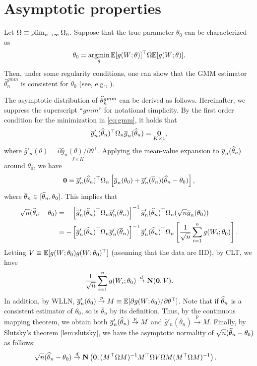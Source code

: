 \documentclass[11pt, A4paper, openany, uplatex]{book}
\begin{document}
\section{Asymptotic properties}\label{sec:asympGMM}
Let $\Omega \equiv \operatorname*{plim}_{n \to \infty} \Omega_n$.
Suppose that the true parameter $\theta_0$ can be characterized as
\[
	\theta_0 = \operatorname*{\arg\!\min}_\theta \mathbb{E}[g(W; \theta)]^\top \Omega \mathbb{E}[g(W; \theta)].
\]
Then, under some regularity conditions, one can show that the GMM estimator $\hat \theta_n^{gmm}$ is consistent for $\theta_0$ (see, e.g., \cite{newey1994large}).

The asymptotic distribution of $\widehat \theta_n^{gmm}$ can be derived as follows.
Hereinafter, we suppress the superscript ``$gmm$'' for notational simplicity.
By the first order condition for the minimization in \eqref{eq:gmm}, it holds that
\[
	\overline{g}'_n(\widehat \theta_n)^\top \Omega_n \overline{g}_n(\widehat \theta_n) = \underset{K \times 1}{\mathbf{0}},
\] 
where $\bar{g}'_n( \theta) = \underset{J \times K}{\partial \bar{g}_n(\theta) / \partial \theta^\top}$.
Applying the mean-value expansion to $\overline{g}_n(\widehat \theta_n)$ around $\theta_0$, we have
\[
	\mathbf{0} = \overline{g}'_n(\widehat \theta_n)^\top \Omega_n \left[\overline{g}_n(\theta_0) +  \overline{g}'_n(\overline{\theta}_n) (\widehat \theta_n - \theta_0) \right],
\]
where $\overline{\theta}_n \in [ \widehat \theta_n, \theta_0]$.
This implies that
\begin{align*}
	\sqrt{n} (\widehat \theta_n - \theta_0) 
	& = -\left[ \overline{g}'_n(\widehat \theta_n)^\top \Omega_n \overline{g}'_n(\overline{\theta}_n) \right]^{-1} \overline{g}'_n(\widehat \theta_n)^\top \Omega_n (\sqrt{n}\overline{g}_n(\theta_0))  \\
	& = -\left[ \overline{g}'_n(\widehat \theta_n)^\top \Omega_n \overline{g}'_n(\overline{\theta}_n) \right]^{-1} \overline{g}'_n(\widehat \theta_n)^\top \Omega_n \left[\frac{1}{\sqrt{n}}\sum_{i=1}^n g(W_i; \theta_0)\right].
\end{align*}
Letting $V \equiv \mathbb{E}[g(W; \theta_0)g(W; \theta_0)^\top]$ (assuming that the data are IID), by CLT, we have
\[
	\frac{1}{\sqrt{n}}\sum_{i=1}^n g(W_i; \theta_0) \overset{d}{\to} \mathbf{N}(\mathbf{0}, V).
\]
In addition, by WLLN, $\overline{g}'_n(\theta_0) \overset{p}{\to} M \equiv  \mathbb{E}[ \partial g(W; \theta_0) / \partial \theta^\top]$.
Note that if $\widehat \theta_n$ is a consistent estimator of $\theta_0$, so is $\bar{\theta}_n$ by its definition. 
Thus, by the continuous mapping theorem, we obtain both $\overline{g}'_n(\widehat \theta_n) \overset{p}{\to} M$ and $\bar{g}'_n(\bar{\theta}_n) \overset{p}{\to} M$.
Finally, by Slutsky's theorem \ref{lem:slutsky}, we have the asymptotic normality of $\sqrt{n} (\widehat \theta_n - \theta_0)$ as follows:
\begin{align}\label{eq:GMMnormal}
\begin{split}
	\sqrt{n} (\widehat \theta_n - \theta_0) 
	& \overset{d}{\to} \mathbf{N}\left(\mathbf{0},  (M^\top \Omega M )^{-1} M^\top \Omega V \Omega M ( M^\top \Omega M )^{-1} \right).
\end{split}
\end{align}
\end{document}
